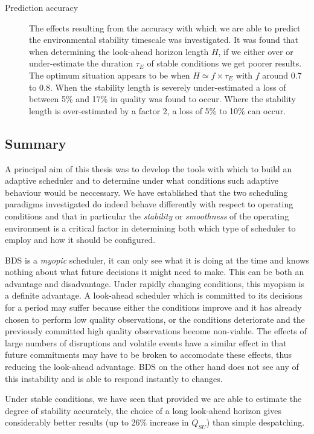 \begin{description}
 \item[Prediction accuracy]
   The effects resulting from the accuracy with which we are able to predict the environmental stability timescale was investigated. It was found that when determining the look-ahead horizon length $H$, if we either over or under-estimate the duration $\tau_E$ of stable conditions we get poorer results. The optimum situation appears to be when $H \simeq f \times \tau_E$ with $f$ around 0.7 to 0.8. When the stability length is severely under-estimated a loss of between 5\% and 17\% in quality was found to occur. Where the stability length is over-estimated by a factor 2, a loss of 5\% to 10\% can occur.

\end{description}

\subsection{Summary}
A principal aim of this thesis was to develop the tools with which to build an adaptive scheduler and to determine under what conditions such adaptive behaviour would be neccessary. We have established that the two scheduling paradigms investigated do indeed behave differently with respect to operating conditions and that in particular the \emph{stability} or \emph{smoothness} of the operating environment is a critical factor in determining both which type of scheduler to employ and how it should be configured.

 BDS is a \emph{myopic} scheduler, it can only see what it is doing at the time and knows nothing about what future decisions it might need to make. This can be both an advantage and disadvantage. Under rapidly changing conditions, this myopism is a definite advantage. A look-ahead scheduler which is committed to its decisions for a period may suffer because either the conditions improve and it has already chosen to perform low quality observations, or the conditions deteriorate and the previously committed high quality observations become non-viable. The effects of large numbers of disruptions and volatile events have a similar effect in that future commitments may have to be broken to accomodate these effects, thus reducing the look-ahead advantage. BDS on the other hand does not see any of this instability and is able to respond instantly to changes.

Under stable conditions, we have seen that provided we are able to estimate the degree of stability accurately, the choice of a long look-ahead horizon gives considerably better results (up to 26\% increase in $Q_{SU}$) than simple despatching.


